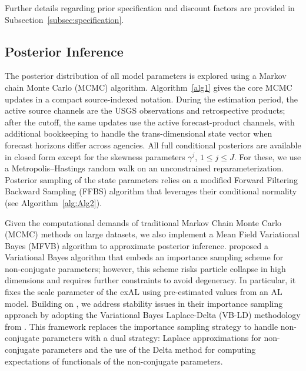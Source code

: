 \documentclass[APA,STIX1COL]{WileyNJD-v2}
\begin{document}
Further details regarding prior specification and discount factors are provided in Subsection~\ref{subsec:specification}.

\subsection{Posterior Inference}
\label{subsec:postinf}
The posterior distribution of all model parameters is explored using a Markov chain Monte Carlo (MCMC) algorithm.
Algorithm~\ref{alg1} gives the core MCMC updates in a compact source-indexed notation. During the estimation period, the active source channels are the USGS observations and retrospective products; after the cutoff, the same updates use the active forecast-product channels, with additional bookkeeping to handle the trans-dimensional state vector when forecast horizons differ across agencies. All full conditional posteriors are available in closed form except for the skewness parameters $\gamma^j$, $1 \leq j \leq J$. For these, we use a Metropolis--Hastings random walk on an unconstrained reparameterization. Posterior sampling of the state parameters relies on a modified Forward Filtering Backward Sampling (FFBS) algorithm that leverages their conditional normality (see Algorithm~\ref{alg:Alg2}).


Given the computational demands of traditional Markov Chain Monte Carlo (MCMC) methods on large datasets, we also implement a Mean Field Variational Bayes (MFVB) algorithm to approximate posterior inference.
\citet{barata2021_flex_quantile} proposed a Variational Bayes algorithm that embeds an importance sampling scheme for non-conjugate parameters; however, this scheme risks particle collapse in high dimensions and requires further constraints to avoid degeneracy. In particular, it fixes the scale parameter of the exAL using pre-estimated values from an AL model. 
Building on \citet{barata2021_flex_quantile}, we address stability issues in their importance sampling approach by adopting the Variational Bayes Laplace-Delta (VB-LD) methodology from \citet{wang2013nonconjugatevb}. This framework replaces the importance sampling strategy to handle non-conjugate parameters with a dual strategy: Laplace approximations for non-conjugate parameters and the use of the Delta method for computing expectations of functionals of the non-conjugate parameters.
\end{document}
